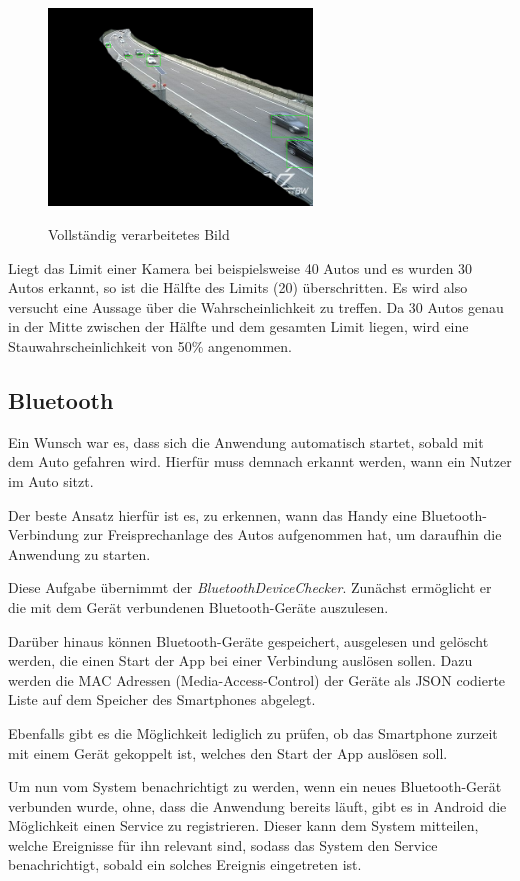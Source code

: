 \begin{figure}[ht]
   \centering
     \includegraphics[width=7cm]{Bilder/process/6} \\
 \caption{Vollständig verarbeitetes Bild}
\end{figure}

Liegt das Limit einer Kamera bei beispielsweise 40 Autos und es wurden 30 Autos erkannt, so ist die Hälfte des Limits (20) überschritten. Es wird also versucht eine Aussage über die Wahrscheinlichkeit zu treffen. Da 30 Autos genau in der Mitte zwischen der Hälfte und dem gesamten Limit liegen, wird eine Stauwahrscheinlichkeit von 50\% angenommen.

\subsection{Bluetooth}
Ein Wunsch war es, dass sich die Anwendung automatisch startet, sobald mit dem Auto gefahren wird.
Hierfür muss demnach erkannt werden, wann ein Nutzer im Auto sitzt.

Der beste Ansatz hierfür ist es, zu erkennen, wann das Handy eine Bluetooth-Verbindung zur Freisprechanlage des Autos aufgenommen hat, um daraufhin die Anwendung zu starten.

Diese Aufgabe übernimmt der {\em BluetoothDeviceChecker}. Zunächst ermöglicht er die mit dem Gerät verbundenen Bluetooth-Geräte auszulesen.

Darüber hinaus können Bluetooth-Geräte gespeichert, ausgelesen und gelöscht werden, die einen Start der App bei einer Verbindung auslösen sollen.
Dazu werden die MAC Adressen (Media-Access-Control) der Geräte als JSON codierte Liste auf dem Speicher des Smartphones abgelegt.

Ebenfalls gibt es die Möglichkeit lediglich zu prüfen, ob das Smartphone zurzeit mit einem Gerät gekoppelt ist, welches den Start der App auslösen soll.

Um nun vom System benachrichtigt zu werden, wenn ein neues Bluetooth-Gerät verbunden wurde, ohne, dass die Anwendung bereits läuft, gibt es in Android die Möglichkeit einen Service zu registrieren.
Dieser kann dem System mitteilen, welche Ereignisse für ihn relevant sind, sodass das System den Service benachrichtigt, sobald ein solches Ereignis eingetreten ist.

